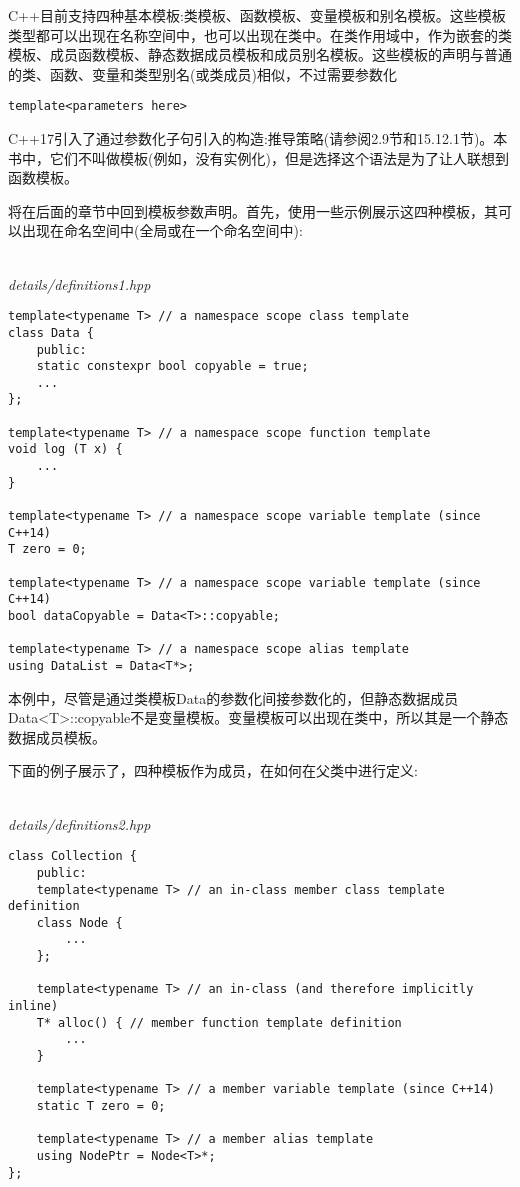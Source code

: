 
C++目前支持四种基本模板:类模板、函数模板、变量模板和别名模板。这些模板类型都可以出现在名称空间中，也可以出现在类中。在类作用域中，作为嵌套的类模板、成员函数模板、静态数据成员模板和成员别名模板。这些模板的声明与普通的类、函数、变量和类型别名(或类成员)相似，不过需要参数化

\begin{lstlisting}[style=styleCXX]
template<parameters here>
\end{lstlisting}

C++17引入了通过参数化子句引入的构造:推导策略(请参阅2.9节和15.12.1节)。本书中，它们不叫做模板(例如，没有实例化)，但是选择这个语法是为了让人联想到函数模板。

将在后面的章节中回到模板参数声明。首先，使用一些示例展示这四种模板，其可以出现在命名空间中(全局或在一个命名空间中):

\hspace*{\fill} \\ %
\noindent
\textit{details/definitions1.hpp}
\begin{lstlisting}[style=styleCXX]
template<typename T> // a namespace scope class template
class Data {
	public:
	static constexpr bool copyable = true;
	...
};

template<typename T> // a namespace scope function template
void log (T x) {
	...
}

template<typename T> // a namespace scope variable template (since C++14)
T zero = 0;

template<typename T> // a namespace scope variable template (since C++14)
bool dataCopyable = Data<T>::copyable;

template<typename T> // a namespace scope alias template
using DataList = Data<T*>;
\end{lstlisting}

本例中，尽管是通过类模板Data的参数化间接参数化的，但静态数据成员Data<T>::copyable不是变量模板。变量模板可以出现在类中，所以其是一个静态数据成员模板。

下面的例子展示了，四种模板作为成员，在如何在父类中进行定义:

\hspace*{\fill} \\ %
\noindent
\textit{details/definitions2.hpp}
\begin{lstlisting}[style=styleCXX]
class Collection {
	public:
	template<typename T> // an in-class member class template definition
	class Node {
		...
	};

	template<typename T> // an in-class (and therefore implicitly inline)
	T* alloc() { // member function template definition
		...
	}

	template<typename T> // a member variable template (since C++14)
	static T zero = 0;
	
	template<typename T> // a member alias template
	using NodePtr = Node<T>*;
};
\end{lstlisting}

